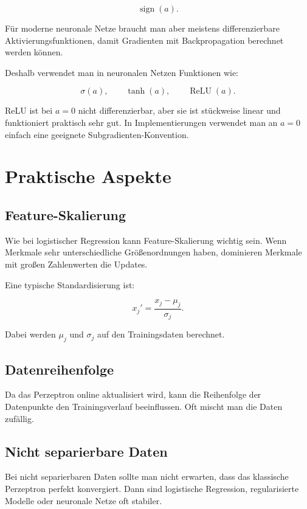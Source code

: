 \[
    \operatorname{sign}(a).
\]

Für moderne neuronale Netze braucht man aber meistens differenzierbare Aktivierungsfunktionen, damit Gradienten mit Backpropagation berechnet werden können.

Deshalb verwendet man in neuronalen Netzen Funktionen wie:

\[
    \sigma(a),
    \qquad
    \tanh(a),
    \qquad
    \operatorname{ReLU}(a).
\]

\begin{notebox}
ReLU ist bei \(a=0\) nicht differenzierbar, aber sie ist stückweise linear und funktioniert praktisch sehr gut.
In Implementierungen verwendet man an \(a=0\) einfach eine geeignete Subgradienten-Konvention.
\end{notebox}

\section{Praktische Aspekte}

\subsection{Feature-Skalierung}

Wie bei logistischer Regression kann Feature-Skalierung wichtig sein.
Wenn Merkmale sehr unterschiedliche Größenordnungen haben, dominieren Merkmale mit großen Zahlenwerten die Updates.

Eine typische Standardisierung ist:

\[
    x_j'
    =
    \frac{x_j-\mu_j}{\sigma_j}.
\]

Dabei werden \(\mu_j\) und \(\sigma_j\) auf den Trainingsdaten berechnet.

\subsection{Datenreihenfolge}

Da das Perzeptron online aktualisiert wird, kann die Reihenfolge der Datenpunkte den Trainingsverlauf beeinflussen.
Oft mischt man die Daten zufällig.

\subsection{Nicht separierbare Daten}

Bei nicht separierbaren Daten sollte man nicht erwarten, dass das klassische Perzeptron perfekt konvergiert.
Dann sind logistische Regression, regularisierte Modelle oder neuronale Netze oft stabiler.


